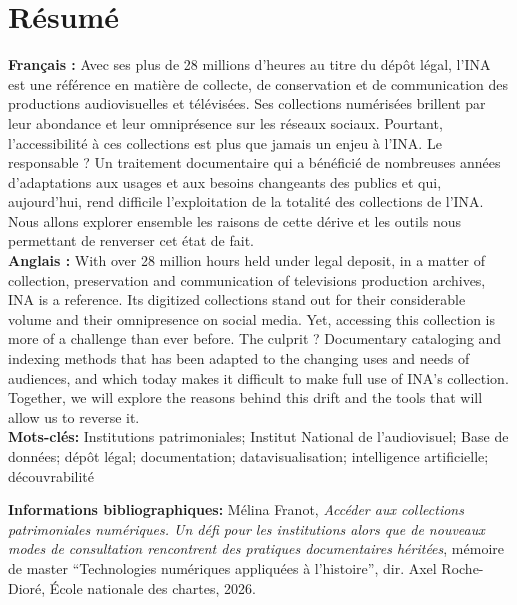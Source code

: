 \documentclass[12pt,twoside, openany]{book} %
\begin{document}
	\thispagestyle{empty}	
	\cleardoublepage
	
\frontmatter

	\chapter{Résumé}
\medskip
	\textbf{Français :} Avec ses plus de 28 millions d'heures au titre du dépôt légal, l'INA est une référence en matière de collecte, de conservation et de communication des productions audiovisuelles et télévisées. Ses collections numérisées brillent par leur abondance et leur omniprésence sur les réseaux sociaux. Pourtant, l'accessibilité à ces collections est plus que jamais un enjeu à l'INA. Le responsable ? Un traitement documentaire qui a bénéficié de nombreuses années d'adaptations aux usages et aux besoins changeants des publics et qui, aujourd'hui, rend difficile l'exploitation de la totalité des collections de l'INA. Nous allons explorer ensemble les raisons de cette dérive et les outils nous permettant de renverser cet état de fait. \\
	
	\textbf{Anglais :} With over 28 million hours held under legal deposit, in a matter of collection, preservation and communication of televisions production archives, INA is a reference. Its digitized collections stand out for their considerable volume and their omnipresence on social media. Yet, accessing this collection is more of a challenge than ever before. The culprit ? Documentary cataloging and indexing methods that has been adapted to the changing uses and needs of audiences, and which today makes it difficult to make full use of INA's collection. Together, we will explore the reasons behind this drift and the tools that will allow us to reverse it.\\
	
	\textbf{Mots-clés:} Institutions patrimoniales; Institut National de l'audiovisuel; Base de données; dépôt légal; documentation; datavisualisation; intelligence artificielle; découvrabilité
	
	\textbf{Informations bibliographiques:} Mélina Franot, \textit{Accéder aux collections patrimoniales numériques. Un défi pour les institutions alors que de nouveaux modes de consultation rencontrent des pratiques documentaires héritées}, mémoire de master \enquote{Technologies numériques appliquées à l'histoire}, dir. Axel Roche-Dioré, École nationale des chartes, 2026.
	
		\newpage{\pagestyle{empty}\cleardoublepage}
	
\end{document}
